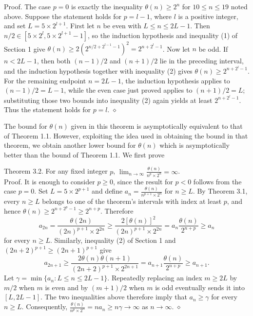 \documentclass[10pt]{article}
\newcommand{\proofend}{\hfill\(\diamond\)}
\begin{document}
Proof. The case $p=0$ is exactly the inequality $\theta(n) \geq 2^{n}$ for $10 \leq n \leq 19$ noted above. Suppose the statement holds for $p=l-1$, where $l$ is a positive integer, and set $L=5 \times 2^{l+1}$. First let $n$ be even with $L \leq n \leq 2L-1$. Then $n/2 \in \left[5 \times 2^{l}, 5 \times 2^{l+1}-1\right]$, so the induction hypothesis and inequality (1) of Section 1 give $\theta(n) \geq 2\left(2^{n/2+2^{l-1}-1}\right)^{2}=2^{n+2^{l}-1}$. Now let $n$ be odd. If $n<2L-1$, then both $(n-1)/2$ and $(n+1)/2$ lie in the preceding interval, and the induction hypothesis together with inequality (2) gives $\theta(n) \geq 2^{n+2^{l}-1}$. For the remaining endpoint $n=2L-1$, the induction hypothesis applies to $(n-1)/2=L-1$, while the even case just proved applies to $(n+1)/2=L$; substituting those two bounds into inequality (2) again yields at least $2^{n+2^{l}-1}$. Thus the statement holds for $p=l$. \proofend

The bound for $\theta(n)$ given in this theorem is asymptotically equivalent to that of Theorem 1.1. However, exploiting the idea used in obtaining the bound in that theorem, we obtain another lower bound for $\theta(n)$ which is asymptotically better than the bound of Theorem 1.1. We first prove

Theorem 3.2. For any fixed integer $p$, $\displaystyle \lim_{n \to \infty} \frac{\theta(n)}{n^{p} \times 2^{n}}=\infty$.\\
Proof. It is enough to consider $p \geq 0$, since the result for $p<0$ follows from the case $p=0$. Set $L=5 \times 2^{p+1}$ and define
$a_n=\frac{\theta(n)}{n^{p+1} \times 2^n}$ for $n \geq L$. By Theorem 3.1, every $n \geq L$ belongs to one of the theorem's intervals with index at least $p$, and hence
$\theta(n) \geq 2^{n+2^p-1} \geq 2^{n+p}$. Therefore
\[
a_{2n}=\frac{\theta(2n)}{(2n)^{p+1} \times 2^{2n}}
 \geq \frac{2[\theta(n)]^2}{(2n)^{p+1} \times 2^{2n}}
 =a_n\frac{\theta(n)}{2^{n+p}} \geq a_n
\]
for every $n \geq L$. Similarly, inequality (2) of Section 1 and $(2n+2)^{p+1} \geq (2n+1)^{p+1}$ give
\[
a_{2n+1}
 \geq \frac{2\theta(n)\theta(n+1)}{(2n+2)^{p+1} \times 2^{2n+1}}
 =a_{n+1}\frac{\theta(n)}{2^{n+p}}
 \geq a_{n+1}.
\]
Let $\gamma=\min\{a_n:L \leq n \leq 2L-1\}$. Repeatedly replacing an index $m \geq 2L$ by $m/2$ when $m$ is even and by $(m+1)/2$ when $m$ is odd eventually sends it into $[L,2L-1]$. The two inequalities above therefore imply that $a_n \geq \gamma$ for every $n \geq L$. Consequently,
$\frac{\theta(n)}{n^p \times 2^n}=n a_n \geq n\gamma \to \infty$ as $n \to \infty$. \proofend
\end{document}
